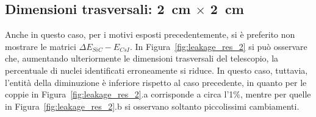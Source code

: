 \subsection*{Dimensioni trasversali: 2~cm $\times$ 2~cm}
Anche in questo caso, per i motivi esposti precedentemente, si è preferito non mostrare le matrici $\Delta E_{SiC} - E_{CsI}$.
In Figura~\ref{fig:leakage_res_2} si può osservare che, aumentando ulteriormente le dimensioni trasversali del telescopio, la percentuale di nuclei identificati erroneamente si riduce.
In questo caso, tuttavia, l'entità della diminuzione è inferiore rispetto al caso precedente, in quanto per le coppie in Figura~\ref{fig:leakage_res_2}.a corrisponde a circa l'1\%, mentre per quelle in Figura~\ref{fig:leakage_res_2}.b si osservano soltanto piccolissimi cambiamenti.


